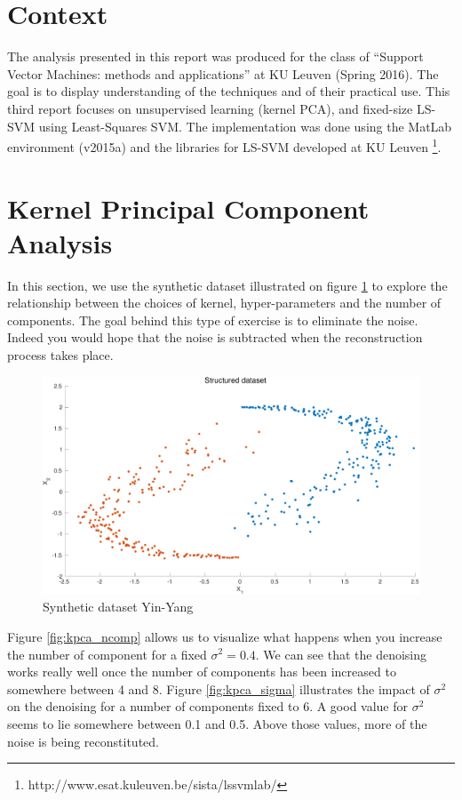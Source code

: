 \documentclass[11pt, a4paper]{article}
\begin{document}

\tableofcontents
\newpage

\section*{Context}

The analysis presented in this report was produced for the class of
``Support Vector Machines: methods and applications'' at KU Leuven
(Spring 2016). The goal is to display understanding of the techniques
and of their practical use. This third report focuses on unsupervised
learning (kernel PCA), and fixed-size LS-SVM using Least-Squares
SVM. The implementation was done using the MatLab environment (v2015a)
and the libraries for LS-SVM developed at KU Leuven
\footnote{http://www.esat.kuleuven.be/sista/lssvmlab/}.

\section{Kernel Principal Component Analysis}

In this section, we use the synthetic dataset illustrated on figure
\ref{fig:kpca_dataset} to explore the relationship between the choices
of kernel, hyper-parameters and the number of components. The goal
behind this type of exercise is to eliminate the noise. Indeed you
would hope that the noise is subtracted when the reconstruction
process takes place.

\begin{figure}[H]
  \centering
  \includegraphics[scale=.35]{kpca_dataset.pdf}
  \caption{Synthetic dataset Yin-Yang}
  \label{fig:kpca_dataset}
\end{figure}

Figure \ref{fig:kpca_ncomp} allows us to visualize what happens when
you increase the number of component for a fixed $\sigma^2=0.4$. We
can see that the denoising works really well once the number of
components has been increased to somewhere between 4 and 8. Figure
\ref{fig:kpca_sigma} illustrates the impact of $\sigma^2$ on the
denoising for a number of components fixed to 6. A good value for
$\sigma^2$ seems to lie somewhere between 0.1 and 0.5. Above those
values, more of the noise is being reconstituted.
\end{document}
